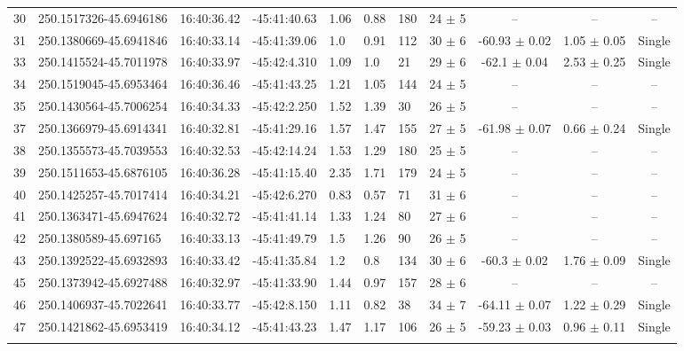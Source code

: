 \documentclass[longauth]{aa} %
\begin{document}
\begin{appendix}
\begin{table}[htbp!]
\begin{tabular}{llllllllccc}
30  &  250.1517326-45.6946186  &  16:40:36.42  &  -45:41:40.63  &  1.06  &  0.88  &  180  &  24 $\pm$ 5  &  --  &  --  &  -- \\
31  &  250.1380669-45.6941846  &  16:40:33.14  &  -45:41:39.06  &  1.0  &  0.91  &  112  &  30 $\pm$ 6  &  -60.93 $\pm$ 0.02  &  1.05 $\pm$ 0.05  &  Single \\
33  &  250.1415524-45.7011978  &  16:40:33.97  &  -45:42:4.310  &  1.09  &  1.0  &  21  &  29 $\pm$ 6  &  -62.1 $\pm$ 0.04  &  2.53 $\pm$ 0.25  &  Single \\
34  &  250.1519045-45.6953464  &  16:40:36.46  &  -45:41:43.25  &  1.21  &  1.05  &  144  &  24 $\pm$ 5  &  --  &  --  &  -- \\
35  &  250.1430564-45.7006254  &  16:40:34.33  &  -45:42:2.250  &  1.52  &  1.39  &  30  &  26 $\pm$ 5  &  --  &  --  &  -- \\
37  &  250.1366979-45.6914341  &  16:40:32.81  &  -45:41:29.16  &  1.57  &  1.47  &  155  &  27 $\pm$ 5  &  -61.98 $\pm$ 0.07  &  0.66 $\pm$ 0.24  &  Single \\
38  &  250.1355573-45.7039553  &  16:40:32.53  &  -45:42:14.24  &  1.53  &  1.29  &  180  &  25 $\pm$ 5  &  --  &  --  &  -- \\
39  &  250.1511653-45.6876105  &  16:40:36.28  &  -45:41:15.40  &  2.35  &  1.71  &  179  &  24 $\pm$ 5  &  --  &  --  &  -- \\
40  &  250.1425257-45.7017414  &  16:40:34.21  &  -45:42:6.270  &  0.83  &  0.57  &  71  &  31 $\pm$ 6  &  --  &  --  &  -- \\
41  &  250.1363471-45.6947624  &  16:40:32.72  &  -45:41:41.14  &  1.33  &  1.24  &  80  &  27 $\pm$ 6  &  --  &  --  &  -- \\
42  &  250.1380589-45.697165  &  16:40:33.13  &  -45:41:49.79  &  1.5  &  1.26  &  90  &  26 $\pm$ 5  &  --  &  --  &  -- \\
43  &  250.1392522-45.6932893  &  16:40:33.42  &  -45:41:35.84  &  1.2  &  0.8  &  134  &  30 $\pm$ 6  &  -60.3 $\pm$ 0.02  &  1.76 $\pm$ 0.09  &  Single \\
45  &  250.1373942-45.6927488  &  16:40:32.97  &  -45:41:33.90  &  1.44  &  0.97  &  157  &  28 $\pm$ 6  &  --  &  --  &  -- \\
46  &  250.1406937-45.7022641  &  16:40:33.77  &  -45:42:8.150  &  1.11  &  0.82  &  38  &  34 $\pm$ 7  &  -64.11 $\pm$ 0.07  &  1.22 $\pm$ 0.29  &  Single \\
47  &  250.1421862-45.6953419  &  16:40:34.12  &  -45:41:43.23  &  1.47  &  1.17  &  106  &  26 $\pm$ 5  &  -59.23 $\pm$ 0.03  &  0.96 $\pm$ 0.11  &  Single \\
\hline \noalign {\smallskip}


\end{tabular}
\end{table}
\end{appendix}
\end{document}
